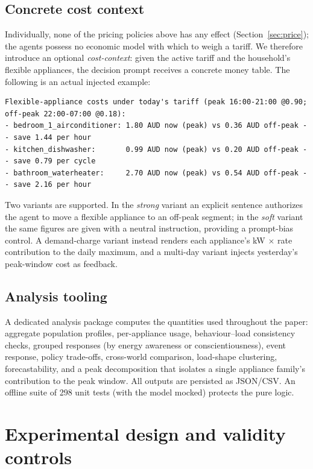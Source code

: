 \documentclass[11pt]{article}
\begin{document}
\subsection{Concrete cost context}
Individually, none of the pricing policies above has any effect (Section~\ref{sec:price}); the agents
possess no economic model with which to weigh a tariff. We therefore introduce an optional
\emph{cost-context}: given the active tariff and the household's flexible appliances, the decision prompt
receives a concrete money table. The following is an actual injected example:
\begin{verbatim}
Flexible-appliance costs under today's tariff (peak 16:00-21:00 @0.90; off-peak 22:00-07:00 @0.18):
- bedroom_1_airconditioner: 1.80 AUD now (peak) vs 0.36 AUD off-peak -- save 1.44 per hour
- kitchen_dishwasher:       0.99 AUD now (peak) vs 0.20 AUD off-peak -- save 0.79 per cycle
- bathroom_waterheater:     2.70 AUD now (peak) vs 0.54 AUD off-peak -- save 2.16 per hour
\end{verbatim}
Two variants are supported. In the \emph{strong} variant an explicit sentence authorizes the agent to
move a flexible appliance to an off-peak segment; in the \emph{soft} variant the same figures are given
with a neutral instruction, providing a prompt-bias control. A demand-charge variant instead renders each
appliance's kW $\times$ rate contribution to the daily maximum, and a multi-day variant injects
yesterday's peak-window cost as feedback.

\subsection{Analysis tooling}
A dedicated analysis package computes the quantities used throughout the paper: aggregate population
profiles, per-appliance usage, behaviour--load consistency checks, grouped responses (by energy awareness
or conscientiousness), event response, policy trade-offs, cross-world comparison, load-shape clustering,
forecastability, and a peak decomposition that isolates a single appliance family's contribution to the
peak window. All outputs are persisted as JSON/CSV. An offline suite of 298 unit tests (with the model
mocked) protects the pure logic.

\section{Experimental design and validity controls}
\label{sec:design}
\end{document}
